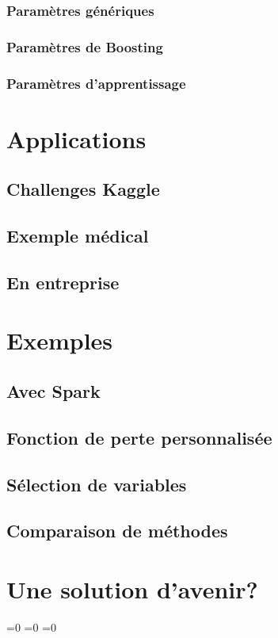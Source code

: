\documentclass[11pt,a4paper]{article}
\begin{document}
\subsubsection{Paramètres génériques}
\subsubsection{Paramètres de Boosting}
\subsubsection{Paramètres d'apprentissage}

\section{Applications}
\subsection{Challenges Kaggle}
\subsection{Exemple médical}
\subsection{En entreprise}

\section{Exemples}
\subsection{Avec Spark}
\subsection{Fonction de perte personnalisée}
\subsection{Sélection de variables}
\subsection{Comparaison de méthodes}

\section{Une solution d'avenir?}

%
%

\makeatletter
\ifnum{}=0
\clearpage
\else\ifnum{}=0
\clearpage
\else\ifnum{}=0
\clearpage
\fi\fi\fi

\end{document}
